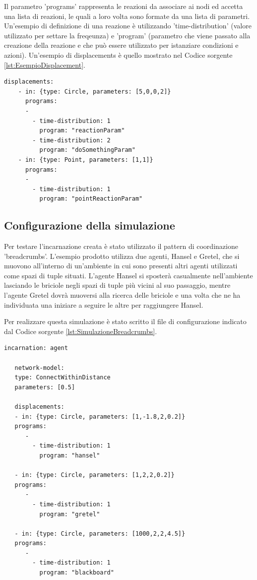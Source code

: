 \documentclass[12pt,a4paper,openright,twoside]{report}
\begin{document}
Il parametro 'programs' rappresenta le reazioni da associare ai nodi ed accetta una lista di reazioni, le quali a loro volta sono formate da una lista di parametri. Un'esempio di definizione di una reazione \`e utilizzando 'time-distribution' (valore utilizzato per settare la freqeunza) e 'program' (parametro che viene passato alla creazione della reazione e che pu\`o essere utilizzato per istanziare condizioni e azioni).
Un'esempio di displacements \`e quello mostrato nel Codice sorgente \ref{lst:EsempioDisplacement}.
\medskip
\begin{lstlisting}[firstnumber=last,label={lst:EsempioDisplacement},caption={Disposizione nodi e reazioni associate}]
  displacements:
    - in: {type: Circle, parameters: [5,0,0,2]}
      programs:
      -
        - time-distribution: 1
          program: "reactionParam"
        - time-distribution: 2
          program: "doSomethingParam"
    - in: {type: Point, parameters: [1,1]}
      programs:
      -
        - time-distribution: 1
          program: "pointReactionParam"
\end{lstlisting}

\subsection{Configurazione della simulazione}
Per testare l'incarnazione creata \`e stato utilizzato il pattern di coordinazione 'breadcrumbs'. L'esempio prodotto utilizza due agenti, Hansel e Gretel, che si muovono all'interno di un'ambiente in cui sono presenti altri agenti utilizzati come spazi di tuple situati. L'agente Hansel si sposter\`a casualmente nell'ambiente lasciando le briciole negli spazi di tuple pi\`u vicini al suo passaggio, mentre l'agente Gretel dovr\`a muoversi alla ricerca delle briciole e una volta che ne ha individuata una iniziare a seguire le altre per raggiungere Hansel.

Per realizzare questa simulazione \`e stato scritto il file di configurazione indicato dal Codice sorgente \ref{lst:SimulazioneBreadcrumbs}.
\medskip
\begin{lstlisting}[firstnumber=1,label={lst:SimulazioneBreadcrumbs},caption={Simulazione modello Spatial Tuples con modello di coordinazione breadcrumbs}]
   incarnation: agent

   network-model:
   type: ConnectWithinDistance
   parameters: [0.5]

   displacements:
   - in: {type: Circle, parameters: [1,-1.8,2,0.2]}
   programs:
      -
        - time-distribution: 1
          program: "hansel"

   - in: {type: Circle, parameters: [1,2,2,0.2]}
   programs:
      -
        - time-distribution: 1
          program: "gretel"

   - in: {type: Circle, parameters: [1000,2,2,4.5]}
   programs:
      -
        - time-distribution: 1
          program: "blackboard"
\end{lstlisting}
\end{document}
